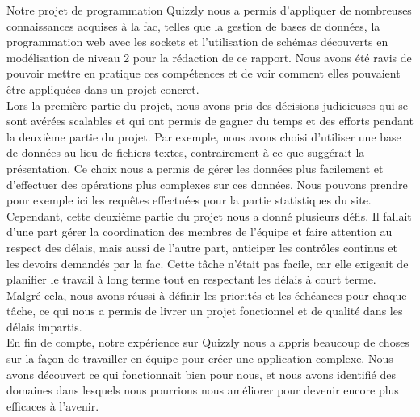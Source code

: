 Notre projet de programmation Quizzly nous a permis d'appliquer de nombreuses connaissances acquises à la fac, telles que la gestion de bases de données, la programmation web avec les sockets et l'utilisation de schémas découverts en modélisation de niveau 2 pour la rédaction de ce rapport. Nous avons été ravis de pouvoir mettre en pratique ces compétences et de voir comment elles pouvaient être appliquées dans un projet concret.\\

Lors la première partie du projet, nous avons pris des décisions judicieuses qui se sont avérées scalables et qui ont permis de gagner du temps et des efforts pendant la deuxième partie du projet. Par exemple, nous avons choisi d'utiliser une base de données au lieu de fichiers textes, contrairement à ce que suggérait la présentation. Ce choix nous a permis de gérer les données plus facilement et d'effectuer des opérations plus complexes sur ces données. Nous pouvons prendre pour exemple ici les requêtes effectuées pour la partie statistiques du site.\\

Cependant, cette deuxième partie du projet nous a donné plusieurs défis.
Il fallait d'une part gérer la coordination des membres de l'équipe et faire attention au respect des délais, mais aussi de l'autre part, anticiper les contrôles continus et les devoirs demandés par la fac. 
Cette tâche n'était pas facile, car elle exigeait de planifier le travail à long terme tout en respectant les délais à court terme. 
Malgré cela, nous avons réussi à définir les priorités et les échéances pour chaque tâche, ce qui nous a permis de livrer un projet fonctionnel et de qualité dans les délais impartis.\\

En fin de compte, notre expérience sur Quizzly nous a appris beaucoup de choses sur la façon de travailler en équipe pour créer une application complexe. Nous avons découvert ce qui fonctionnait bien pour nous, et nous avons identifié des domaines dans lesquels nous pourrions nous améliorer pour devenir encore plus efficaces à l'avenir.